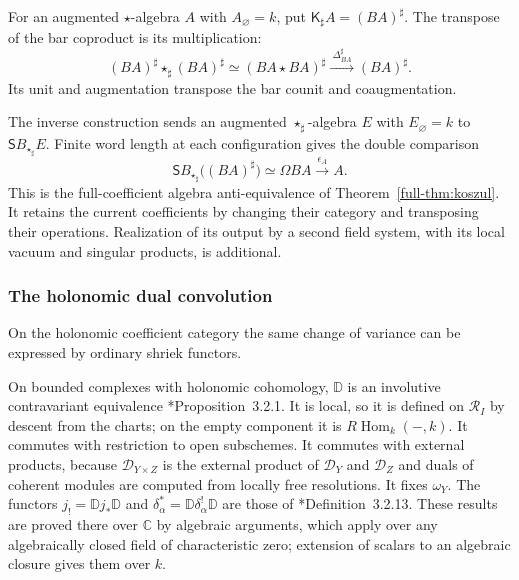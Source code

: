 For\label{ogd:def:pro-perfect-koszul-algebra} an augmented $\star$-algebra $A$ with $A_\varnothing=k$, put
$\mathsf K_\sharp A=(BA)^\sharp$.
The transpose of the bar coproduct is its multiplication:
\[
 (BA)^\sharp\star_\sharp(BA)^\sharp
 \simeq(BA\star BA)^\sharp
 \xrightarrow{\ \Delta_{BA}^\sharp\ }(BA)^\sharp.
\]
Its unit and augmentation transpose the bar counit and coaugmentation.

The inverse construction sends an augmented $\star_\sharp$-algebra $E$
with $E_\varnothing=k$ to $\mathsf S B_{\star_\sharp}E$.
Finite word length at each configuration gives the double comparison
\[
 \mathsf S B_{\star_\sharp}\bigl((BA)^\sharp\bigr)
 \simeq\Omega BA\xrightarrow{\epsilon_A}A.
\]
This is the full-coefficient algebra anti-equivalence of
Theorem~\ref{full-thm:koszul}.
It retains the current coefficients by changing their category and
transposing their operations. Realization of its output by a second
field system, with its local vacuum and singular products, is additional.

\subsubsection{The holonomic dual convolution}

On the holonomic coefficient category the same change of variance
can be expressed by ordinary shriek functors.

On\label{ogd:def:holonomic-verdier-duality} bounded complexes with holonomic cohomology, \(\mathbb D\) is an involutive contravariant equivalence \cite{kd-HTT}*{Proposition~3.2.1}.
It is local, so it is defined on \(\mathscr R_I\) by descent from the charts; on the empty component it is \(R\operatorname{Hom}_k(-,k)\).
It commutes with restriction to open subschemes.
It commutes with external products, because \(\mathcal D_{Y\times Z}\) is the external product of \(\mathcal D_Y\) and \(\mathcal D_Z\) and duals of coherent modules are computed from locally free resolutions.
It fixes \(\omega_Y\).
The functors \(j_!=\mathbb Dj_*\mathbb D\) and \(\delta_\alpha^*=\mathbb D\delta_\alpha^!\mathbb D\) are those of \cite{kd-HTT}*{Definition~3.2.13}.
These results are proved there over \(\mathbb C\) by algebraic arguments, which apply over any algebraically closed field of characteristic zero; extension of scalars to an algebraic closure gives them over \(k\).

